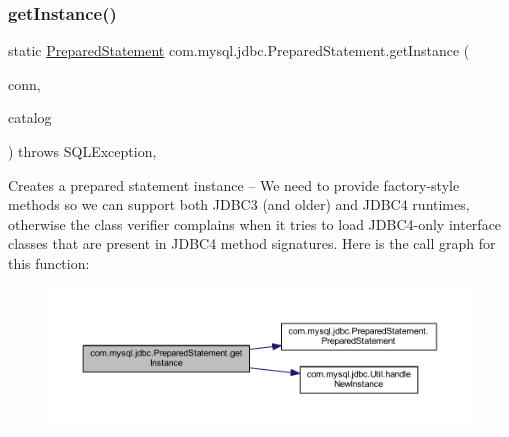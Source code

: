 \subsubsection{\texorpdfstring{get\+Instance()}{getInstance()}\hspace{0.1cm}{\footnotesize\ttfamily [1/3]}}
{\footnotesize\ttfamily static \mbox{\hyperlink{classcom_1_1mysql_1_1jdbc_1_1_prepared_statement}{Prepared\+Statement}} com.\+mysql.\+jdbc.\+Prepared\+Statement.\+get\+Instance (\begin{DoxyParamCaption}\item[{\mbox{\hyperlink{interfacecom_1_1mysql_1_1jdbc_1_1_my_s_q_l_connection}{My\+S\+Q\+L\+Connection}}}]{conn,  }\item[{String}]{catalog }\end{DoxyParamCaption}) throws S\+Q\+L\+Exception\hspace{0.3cm}{\ttfamily [static]}, {\ttfamily [protected]}}

Creates a prepared statement instance -- We need to provide factory-\/style methods so we can support both J\+D\+B\+C3 (and older) and J\+D\+B\+C4 runtimes, otherwise the class verifier complains when it tries to load J\+D\+B\+C4-\/only interface classes that are present in J\+D\+B\+C4 method signatures. Here is the call graph for this function\+:
\nopagebreak
\begin{figure}[H]
\begin{center}
\leavevmode
\includegraphics[width=350pt]{classcom_1_1mysql_1_1jdbc_1_1_prepared_statement_a3f7dd0edd868d1c66f08be25392fba8e_cgraph}
\end{center}
\end{figure}
\mbox{\label{classcom_1_1mysql_1_1jdbc_1_1_prepared_statement_a597b46826cbe709aaee73ee7ccb1ab85}} 
